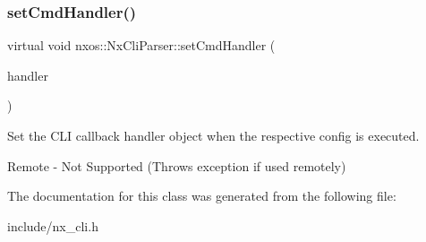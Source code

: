\subsubsection{\texorpdfstring{set\+Cmd\+Handler()}{setCmdHandler()}}
{\footnotesize\ttfamily virtual void nxos\+::\+Nx\+Cli\+Parser\+::set\+Cmd\+Handler (\begin{DoxyParamCaption}\item[{\mbox{\hyperlink{classnxos_1_1_nx_cmd_handler}{Nx\+Cmd\+Handler}} $\ast$}]{handler }\end{DoxyParamCaption})\hspace{0.3cm}{\ttfamily [pure virtual]}}

Set the C\+LI callback handler object when the respective config is executed.

\begin{DoxyVerb}Remote - Not Supported (Throws exception if used remotely)\end{DoxyVerb}
 

The documentation for this class was generated from the following file\+:\begin{DoxyCompactItemize}
\item 
include/nx\+\_\+cli.\+h\end{DoxyCompactItemize}
